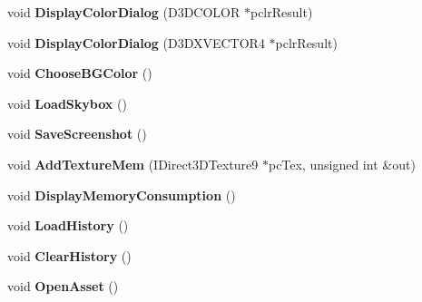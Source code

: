 \begin{DoxyCompactItemize}
\item 
\hypertarget{namespace_assimp_view_a31d4b242f39d3ffca0b27169753d31ee}{void {\bfseries Display\+Color\+Dialog} (D3\+D\+C\+O\+L\+O\+R $\ast$pclr\+Result)}\label{namespace_assimp_view_a31d4b242f39d3ffca0b27169753d31ee}

\item 
\hypertarget{namespace_assimp_view_a6a3c0edf0873e4b04c17c671154c4e96}{void {\bfseries Display\+Color\+Dialog} (D3\+D\+X\+V\+E\+C\+T\+O\+R4 $\ast$pclr\+Result)}\label{namespace_assimp_view_a6a3c0edf0873e4b04c17c671154c4e96}

\item 
\hypertarget{namespace_assimp_view_a6360a982c567fb98a758aa83ce639432}{void {\bfseries Choose\+B\+G\+Color} ()}\label{namespace_assimp_view_a6360a982c567fb98a758aa83ce639432}

\item 
\hypertarget{namespace_assimp_view_af126f4854fc59162b0e6f04f224b75c4}{void {\bfseries Load\+Skybox} ()}\label{namespace_assimp_view_af126f4854fc59162b0e6f04f224b75c4}

\item 
\hypertarget{namespace_assimp_view_a2739b16f811a776c1555177055290462}{void {\bfseries Save\+Screenshot} ()}\label{namespace_assimp_view_a2739b16f811a776c1555177055290462}

\item 
\hypertarget{namespace_assimp_view_a5c075b51dd3071d4171d585497823ba0}{void {\bfseries Add\+Texture\+Mem} (I\+Direct3\+D\+Texture9 $\ast$pc\+Tex, unsigned int \&out)}\label{namespace_assimp_view_a5c075b51dd3071d4171d585497823ba0}

\item 
\hypertarget{namespace_assimp_view_aed0181f19b919f988ff499b1cb3b0ecf}{void {\bfseries Display\+Memory\+Consumption} ()}\label{namespace_assimp_view_aed0181f19b919f988ff499b1cb3b0ecf}

\item 
\hypertarget{namespace_assimp_view_a49871f96bcd505ae3fa6f0693285d7de}{void {\bfseries Load\+History} ()}\label{namespace_assimp_view_a49871f96bcd505ae3fa6f0693285d7de}

\item 
\hypertarget{namespace_assimp_view_afd9341ac9f0b1408b928f5fb02f922e9}{void {\bfseries Clear\+History} ()}\label{namespace_assimp_view_afd9341ac9f0b1408b928f5fb02f922e9}

\item 
\hypertarget{namespace_assimp_view_a07d9a0540dffd7769fd70870aa489ace}{void {\bfseries Open\+Asset} ()}\label{namespace_assimp_view_a07d9a0540dffd7769fd70870aa489ace}


\end{DoxyCompactItemize}
